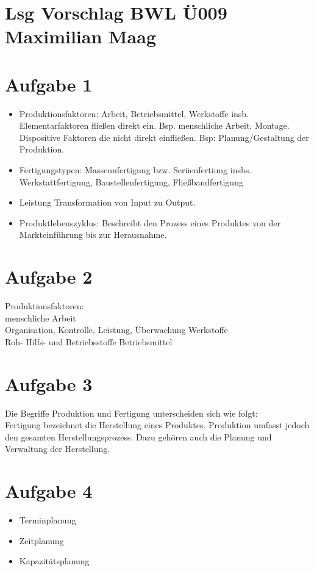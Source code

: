 \documentclass{article}
\begin{document}
	\section*{Lsg Vorschlag BWL Ü009 Maximilian Maag}
	\section*{Aufgabe 1}
	\begin{itemize}
		\item Produktionsfaktoren: Arbeit, Betriebsmittel, Werkstoffe insb. Elementarfaktoren fließen direkt ein. Bsp. menschliche Arbeit, Montage. Dispositive Faktoren die nicht direkt einfließen. Bsp: Planung/Gestaltung der Produktion.
		\item Fertigungstypen: Massennfertigung bzw. Seriienfertiung insbs. Werkstattfertigung, Baustellenfertigung, Fließbandfertigung
		\item Leistung Transformation von Input zu Output.
		\item Produktlebenszyklus: Beschreibt den Prozess eines Produktes von der Markteinführung bis zur Herausnahme. 
	\end{itemize}
	\section*{Aufgabe 2}
	Produktionsfaktoren: \\
	menschliche Arbeit \\
	Organisation, Kontrolle, Leistung, Überwachung
	Werkstoffe \\
	Roh- Hilfs- und Betriebsstoffe
	Betriebsmittel
	
	\section*{Aufgabe 3}
	Die Begriffe Produktion und Fertigung unterscheiden sich wie folgt: \\
	Fertigung bezeichnet die Herstellung eines Produktes. Produktion umfasst jedoch den gesamten Herstellungsprozess. Dazu gehören auch die Planung und Verwaltung der Herstellung.
	\section*{Aufgabe 4}
	\begin{itemize}
		\item Terminplanung
		\item Zeitplanung
		\item Kapazitätsplanung
	\end{itemize}
\end{document}
